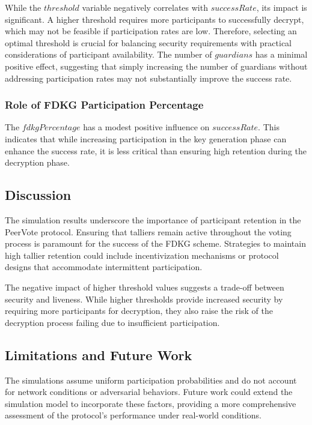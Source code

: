 \documentclass[runningheads]{llncs}
\begin{document}
While the $threshold$ variable negatively correlates with $successRate$, its impact is significant. A higher threshold requires more participants to successfully decrypt, which may not be feasible if participation rates are low. Therefore, selecting an optimal threshold is crucial for balancing security requirements with practical considerations of participant availability. The number of $guardians$ has a minimal positive effect, suggesting that simply increasing the number of guardians without addressing participation rates may not substantially improve the success rate.

\subsubsection{Role of FDKG Participation Percentage}

The $fdkgPercentage$ has a modest positive influence on $successRate$. This indicates that while increasing participation in the key generation phase can enhance the success rate, it is less critical than ensuring high retention during the decryption phase.

\subsection{Discussion}

The simulation results underscore the importance of participant retention in the PeerVote protocol. Ensuring that talliers remain active throughout the voting process is paramount for the success of the FDKG scheme. Strategies to maintain high tallier retention could include incentivization mechanisms or protocol designs that accommodate intermittent participation.

The negative impact of higher threshold values suggests a trade-off between security and liveness. While higher thresholds provide increased security by requiring more participants for decryption, they also raise the risk of the decryption process failing due to insufficient participation.

\subsection{Limitations and Future Work}

The simulations assume uniform participation probabilities and do not account for network conditions or adversarial behaviors. Future work could extend the simulation model to incorporate these factors, providing a more comprehensive assessment of the protocol's performance under real-world conditions.
\end{document}
